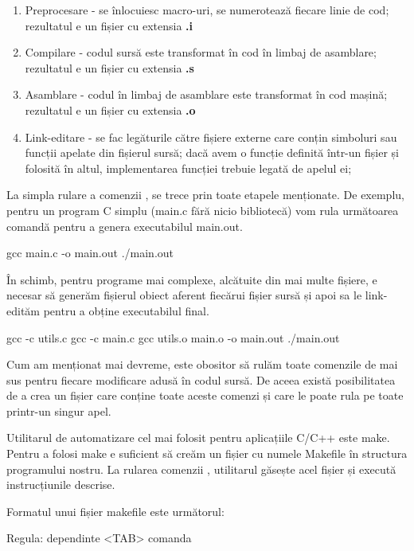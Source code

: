 \begin{enumerate}
	\item Preprocesare - se înlocuiesc macro-uri, se numerotează fiecare
		linie de cod; rezultatul e un fișier cu extensia \textbf{.i}
	\item Compilare - codul sursă este transformat în cod în limbaj de
		asamblare; rezultatul e un fișier cu extensia \textbf{.s}
	\item Asamblare - codul în limbaj de asamblare este transformat în cod
		mașină; rezultatul e un fișier cu extensia \textbf{.o}
	\item Link-editare - se fac legăturile către fișiere externe care conțin
		simboluri sau funcții apelate din fișierul sursă; dacă avem o
		funcție definită într-un fișier și folosită în altul,
		implementarea funcției trebuie legată de apelul ei;
\end{enumerate}

La simpla rulare a comenzii , se trece prin toate etapele menționate.
De exemplu, pentru un program C simplu (main.c fără nicio bibliotecă) vom rula
următoarea comandă pentru a genera executabilul main.out.

\begin{screen}
gcc main.c -o main.out
./main.out
\end{screen}

În schimb, pentru programe mai complexe, alcătuite din mai multe fișiere, e
necesar să generăm fișierul obiect aferent fiecărui fișier sursă și apoi sa le
link-edităm pentru a obține executabilul final.

\begin{screen}
gcc -c utils.c
gcc -c main.c
gcc utils.o main.o -o main.out
./main.out
\end{screen}

Cum am menționat mai devreme, este obositor să rulăm toate comenzile de mai sus
pentru fiecare modificare adusă în codul sursă. De aceea există posibilitatea de
a crea un fișier care conține toate aceste comenzi și care le poate rula pe
toate printr-un singur apel.

Utilitarul de automatizare cel mai folosit pentru aplicațiile C/C++ este make.
Pentru a folosi make e suficient să creăm un fișier cu numele Makefile în
structura programului nostru. La rularea comenzii , utilitarul găsește
acel fișier și execută instrucțiunile descrise.

Formatul unui fișier makefile este următorul:

\begin{screen}
Regula: dependinte
<TAB> comanda
\end{screen}

